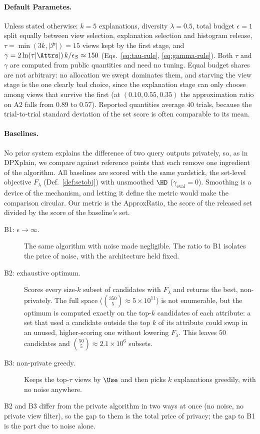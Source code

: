 \paragraph{Default Parametes.}
Unless stated otherwise: $k=5$ explanations, diversity $\lambda=0.5$, total budget $\epsilon=1$ split equally between view selection, explanation selection and histogram release, $\tau=\min(3k,|\mathcal P|)=15$ views kept by the first stage, and $\gamma=2\ln(\tau|\Attrs|)\,k/\epsilon_S\approx150$ (Eqs.~\eqref{eq:tau-rule}, \eqref{eq:gamma-rule}).
Both $\tau$ and $\gamma$ are computed from public quantities and need no tuning.
Equal budget shares are not arbitrary: no allocation we swept dominates them, and starving the view stage is the one clearly bad choice, since the explanation stage can only choose among views that survive the first (at $(0.10,0.55,0.35)$ the approximation ratio on A2 falls from $0.89$ to $0.57$).
Reported quantities average $40$ trials, because the trial-to-trial standard deviation of the set score is often comparable to its mean.

\paragraph{Baselines.}
No prior system explains the difference of two query outputs privately, so, as in DPXplain, we compare against reference points that each remove one ingredient of the algorithm.
All baselines are scored with the same yardstick, the set-level objective $F_\lambda$ (Def.~\ref{def:setobj}) with unsmoothed $\HD$ ($\gamma_{\mathrm{eval}}=0$). Smoothing is a device of the mechanism, and letting it define the metric would make the comparison circular.
Our metric is the ApproxRatio, the score of the released set divided by the score of the baseline's set.
\begin{description}
  \item[B1: $\epsilon\to\infty$.] The same algorithm with noise made negligible. The ratio to B1 isolates the price of noise, with the architecture held fixed.
  \item[B2: exhaustive optimum.] Scores every size-$k$ subset of candidates with $F_\lambda$ and returns the best, non-privately. The full space ($\binom{350}{5}\approx5\times10^{11}$) is not enumerable, but the optimum is computed exactly on the top-$k$ candidates of each attribute: a set that used a candidate outside the top $k$ of its attribute could swap in an unused, higher-scoring one without lowering $F_\lambda$. This leaves $50$ candidates and $\binom{50}{5}\approx2.1\times10^{6}$ subsets.
  \item[B3: non-private greedy.] Keeps the top-$\tau$ views by $\Use$ and then picks $k$ explanations greedily, with no noise anywhere.
\end{description}
B2 and B3 differ from the private algorithm in two ways at once (no noise, no private view filter), so the gap to them is the total price of privacy; the gap to B1 is the part due to noise alone.


